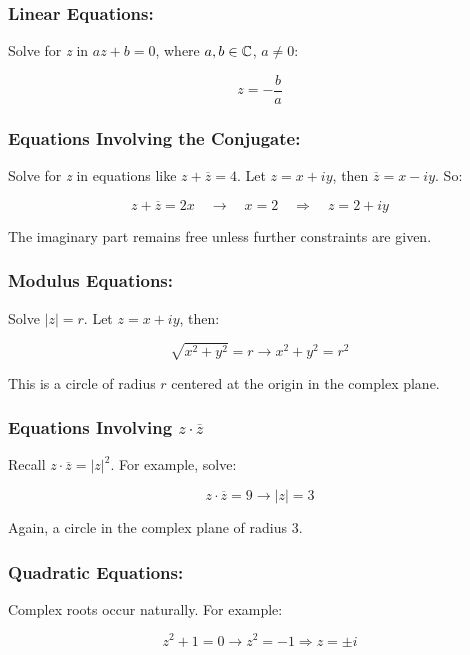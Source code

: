 \subsubsection{Linear Equations:}

Solve for \emph{z} in \( az + b = 0 \), where \( a, b \in \mathbb{C} \), \( a \neq 0 \):
	
\[
	z = -\frac{b}{a}
\]

\subsubsection{Equations Involving the Conjugate:}

Solve for \emph{z} in equations like \( z + \overline{z} = 4 \).
Let \( z = x + iy \), then \( \overline{z} = x - iy \). So:
	      
\[
	z + \overline{z} = 2x \quad \to \quad x = 2 \quad \Rightarrow \quad z = 2 + iy
\]
	      
The imaginary part remains free unless further constraints are given.

\subsubsection{Modulus Equations:}

Solve \( |z| = r \). Let \( z = x + iy \), then:
	      
\[
	\sqrt{x^2 + y^2} = r \to x^2 + y^2 = r^2
\]

This is a circle of radius \( r \) centered at the origin in the complex plane.

\subsubsection{Equations Involving \texorpdfstring{\( z \cdot \overline{z} \)}{}}

Recall \( z \cdot \overline{z} = |z|^2 \). For example, solve:
	      
\[
	z \cdot \overline{z} = 9 \to |z| = 3
\]

Again, a circle in the complex plane of radius 3.

\subsubsection{Quadratic Equations:}

Complex roots occur naturally. For example:

\[
	z^2 + 1 = 0 \to z^2 = -1 \Rightarrow z = \pm i
\]

